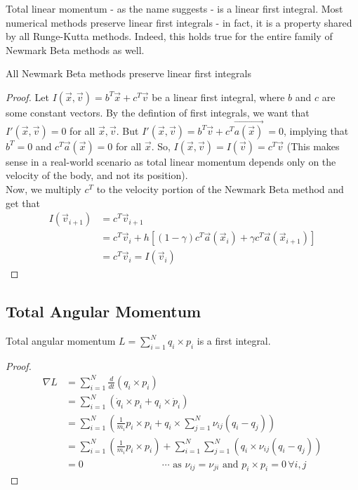 \documentclass[../Main.tex]{subfiles}
\begin{document}
Total linear momentum - as the name suggests - is a linear first integral. Most numerical methods preserve linear first integrals - in fact, it is a property shared by all Runge-Kutta methods. Indeed, this holds true for the entire family of Newmark Beta methods as well.
\begin{claim} All Newmark Beta methods preserve linear first integrals \end{claim}
\begin{proof}
Let $I(\vec{x}, \vec{v}) = b^{T}\vec{x} + c^{T}\vec{v}$ be a linear first integral, where $b$ and $c$ are some constant vectors.
By the defintion of first integrals, we want that $I'(\vec{x}, \vec{v})= 0$ for all $\vec{x}, \vec{v}$.
But $I'(\vec{x}, \vec{v}) = b^{T}\vec{v} + c^{T}\vec{a(\vec{x})}\ = 0$, implying that $b^{T} = 0$ and $c^{T}\vec{a}(\vec{x}) = 0$ for all $\vec{x}$. So, $I(\vec{x}, \vec{v}) = I(\vec{v}) = c^{T}\vec{v}$ (This makes sense in a real-world scenario as total linear momentum depends only on the velocity of the body, and not its position).\\
Now, we multiply $c^{T}$ to the velocity portion of the Newmark Beta method and get that
\begin{align*}
I\left(\vec{v}_{i+1}\right) &= c^{T}\vec{v}_{i+1} \\
&= c^{T}\vec{v}_{i} + h\left[\left(1-\gamma\right)c^{T}\vec{a}(\vec{x}_{i}) + \gamma c^{T}\vec{a}(\vec{x}_{i+1})\right] \\
&= c^{T}\vec{v}_{i} = I\left(\vec{v}_{i}\right)
\end{align*} 
\end{proof}

\subsection{Total Angular Momentum}

\begin{theorem} Total angular momentum $L = \sum_{i=1}^{N} q_{i} \times p_{i}$ is a first integral. \end{theorem}
\begin{proof}
\begin{align*}
\nabla L & = \sum_{i=1}^{N} \frac{d}{dt} \left(q_{i} \times p_{i}\right) \\
& = \sum_{i=1}^{N} \left(\dot{q}_{i} \times p_{i} + {q}_{i} \times \dot{p}_{i}\right) \\  
& = \sum_{i=1}^{N} \left( \frac{1}{m_{i}}p_{i} \times p_{i} + q_{i} \times \sum_{j=1}^{N}\nu_{ij}\left(q_{i} - q_{j}\right)\right) \\  
& = \sum_{i=1}^{N} \left( \frac{1}{m_{i}}p_{i} \times p_{i}\right) +  \sum_{i=1}^{N}\sum_{j=1}^{N} \left(q_{i} \times \nu_{ij}\left(q_{i} - q_{j}\right)\right) \\
& = 0  \qquad \qquad \qquad \qquad \cdots \mbox{ as }\nu_{ij} = \nu_{ji} \mbox{ and } p_{i} \times p_{i} = 0 \,\forall i, j
\end{align*}
\end{proof}
\end{document}
